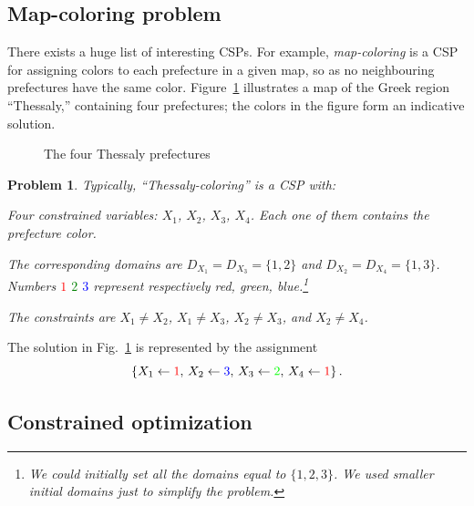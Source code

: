 \documentclass{ws-ijait}
\newtheorem{problem}{Problem}
\begin{document}
\subsection{Map-coloring problem}

There exists a huge list of interesting CSPs.\cite{Gent1999}
For example, \emph{map-coloring} is a CSP for assigning
colors to each prefecture in a given map, so as no
neighbouring prefectures have the same color.
Figure~\ref{map-colored} illustrates a map of the Greek
region ``Thessaly,'' containing four prefectures; the colors
in the figure form an indicative solution.

\begin{figure}
  \centering
  
  \caption{The four Thessaly prefectures\label{map-colored}}
\end{figure}

\begin{problem}
  \label{thessaly-coloring}
  Typically, \emph{``Thessaly-coloring''} is a CSP with:
  \begin{romanlist}
    \item Four constrained variables: $X_1$, $X_2$, $X_3$,
          $X_4$. Each one of them contains the prefecture
          color.
    \item The corresponding domains are $D_{X_1} = D_{X_3} =
          \{1, 2\}$ and $D_{X_2} = D_{X_4} = \{1, 3\}$.
          Numbers \textcolor{red}{$1$}
          \textcolor{green}{$2$} \textcolor{blue}{$3$}
          represent respectively red, green,
          blue.\footnote{We could initially set all the
          domains equal to $\{1, 2, 3\}$. We used smaller
          initial domains just to simplify the problem.}
    \item The constraints are $X_1 \neq X_2$, $X_1 \neq
          X_3$, $X_2 \neq X_3$, and $X_2 \neq X_4$.
  \end{romanlist}
\end{problem}
The solution in Fig.~\ref{map-colored} is represented by the
assignment
\begin{equation}
  \label{solution}
  \{X_1 \gets \textcolor{red}{1}, \, X_2 \gets
  \textcolor{blue}{3}, \, X_3 \gets \textcolor{green}{2}, \,
  X_4 \gets \textcolor{red}{1}\} \, .
\end{equation}

\subsection{Constrained optimization\label{COP}}
\end{document}
